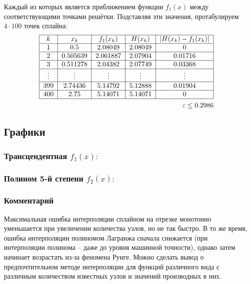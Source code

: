 Каждый из которых является приближением функции $f_1(x)$ между соответствующими точками решётки. Подставляя эти значения, протабулируем $4\cdot100$ точек сплайна:
\begin{align}
    \begin{tabular}{|c|c|c|c|c|}
        \hline
        $k$ & $x_k$ & $f_1(x_k)$ & $H(x_k)$ & $|H(x_k)-f_1(x_k)|$ \\
        \hline
        1 & 0.5      & 2.08049 & 2.08049 & 0 \\
        \hline
        2 & 0.505639 & 2.061887& 2.07904 &  0.01716 \\
        \hline
        3 & 0.511278 & 2.04382 & 2.07749 &  0.03368 \\
        \hline
        $\vdots$ & $\vdots$ & $\vdots$ & $\vdots$ &  $\vdots$ \\
        \hline
        399 & 2.74436   & 5.14792 &	5.12888 &  0.01904 \\
        \hline
        400 & 2.75 & 5.14071  & 5.14071 &  0\\
        \hline
    \end{tabular}\\
    \varepsilon \le 0.2986
\end{align}

\subsection{Графики}

\subsubsection{Трансцендентная $f_1(x):$}


\subsubsection{Полином 5-й степени $f_2(x):$}


\subsubsection*{Комментарий}
Максимальная ошибка интерполяции сплайном на отрезке монотонно уменьшается при увеличении количества узлов, но не так быстро. В то же время, ошибка интерполяции полиномом Лагранжа сначала снижается (при интерполяции полинома -- даже до уровня машинной точности), однако затем начинает возрастать из-за феномена Рунге. Можно сделать вывод о предпочтительном методе интерполяции для функций различного вида с различным количеством известных узлов и значений производных в них.

